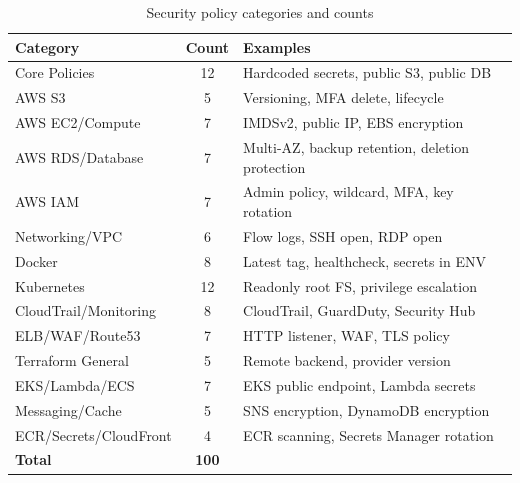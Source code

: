 \begin{table}[H]
\centering
\caption{Security policy categories and counts}
\label{tab:policy-categories}
\small
\begin{tabular}{|l|c|l|}
\hline
\textbf{Category} & \textbf{Count} & \textbf{Examples} \\
\hline
Core Policies & 12 & Hardcoded secrets, public S3, public DB \\
\hline
AWS S3 & 5 & Versioning, MFA delete, lifecycle \\
\hline
AWS EC2/Compute & 7 & IMDSv2, public IP, EBS encryption \\
\hline
AWS RDS/Database & 7 & Multi-AZ, backup retention, deletion protection \\
\hline
AWS IAM & 7 & Admin policy, wildcard, MFA, key rotation \\
\hline
Networking/VPC & 6 & Flow logs, SSH open, RDP open \\
\hline
Docker & 8 & Latest tag, healthcheck, secrets in ENV \\
\hline
Kubernetes & 12 & Readonly root FS, privilege escalation \\
\hline
CloudTrail/Monitoring & 8 & CloudTrail, GuardDuty, Security Hub \\
\hline
ELB/WAF/Route53 & 7 & HTTP listener, WAF, TLS policy \\
\hline
Terraform General & 5 & Remote backend, provider version \\
\hline
EKS/Lambda/ECS & 7 & EKS public endpoint, Lambda secrets \\
\hline
Messaging/Cache & 5 & SNS encryption, DynamoDB encryption \\
\hline
ECR/Secrets/CloudFront & 4 & ECR scanning, Secrets Manager rotation \\
\hline
\textbf{Total} & \textbf{100} & \\
\hline
\end{tabular}
\end{table}

%

